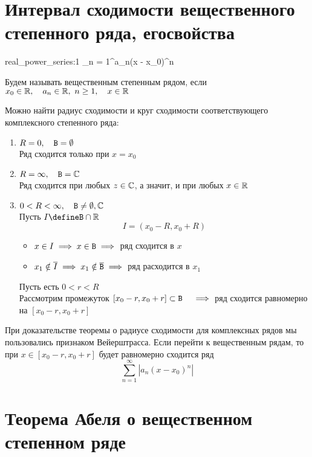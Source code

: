 \section{Интервал сходимости вещественного степенного ряда, его\n свойства}

\begin{definition}
	\begin{equ}{real_power_series:1}
		\sum_{n = 1}^\infty a_n(x - x_0)^n
	\end{equ}
	Будем называть  вещественным степенным рядом, если $ x_0 \in \mathbb{R}, \quad a_n \in \mathbb{R}, ~ n \ge 1, \quad x \in \mathbb{R} $
\end{definition}

Можно найти радиус сходимости и круг сходимости соответствующего комплексного степенного ряда:

\begin{enumerate}
	\item $ R = 0, \quad \mathtt{B} = \emptyset $ \\
	Ряд сходится только при $ x = x_0 $
	\item $ R = \infty, \quad \mathtt{B} = \mathbb{C} $ \\
	Ряд сходится при любых $ z \in \mathbb{C} $, а значит, и при любых $ x \in \mathbb{R} $
	\item $ 0 < R < \infty, \quad \mathtt{B} \ne \emptyset, \mathbb{C} $ \\
	Пусть $ I \define \B \cap \R $
	$$ I = (x_0 - R, x_0 + R) $$
	\begin{itemize}
		\item $ x \in I \implies x \in \mathtt{B} \implies $ ряд сходится в $ x $
		\item $ x_1 \notin \overline I \implies x_1 \notin \overline{\mathtt{B}} \implies $ ряд расходится в $ x_1 $
	\end{itemize}
	Пусть есть $ 0 < r < R $ \\
	Рассмотрим промежуток $ [x_0 - r, x_0 + r] \subset \mathtt{B} \quad \implies $ ряд сходится равномерно на $ [x_0 - r, x_0 + r] $
\end{enumerate}

При доказательстве теоремы о радиусе сходимости для комплексных рядов мы пользовались признаком Вейерштрасса. Если перейти к вещественным рядам, то при $ x \in [x_0 - r, x_0 + r] $ будет равномерно сходится ряд
$$ \sum_{n = 1}^\infty |a_n(x - x_0)^n| $$

\section{Теорема Абеля о вещественном степенном ряде}

